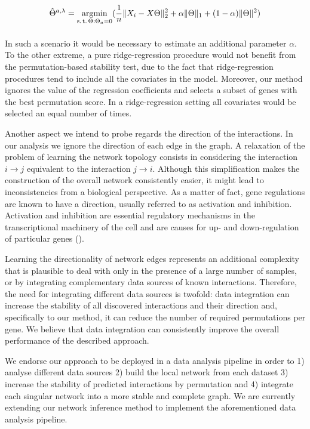 \begin{equation}
\label{eq:elnet}
    \hat{\Theta}^{a,\lambda} = 
    \argmin_{%
      \substack{%
        \text{s.\,t.}\, \Theta:\Theta_a = 0 \\
        \phantom{}\, 
      }
    }
    (\frac{1}{n} \| X_i - X\Theta \|^{2}_2 + \alpha \| \Theta \|_{1} + (1-\alpha) \| \Theta \|^{2})
  \end{equation}
   

In such a scenario it would be necessary to estimate an additional parameter $\alpha$. To the other extreme, a pure ridge-regression procedure would not benefit from the permutation-based stability test, due to the fact that ridge-regression procedures tend to include all the covariates in the model. Moreover, our method ignores the value of the regression coefficients and selects a subset of genes with the best permutation score. In a ridge-regression setting all covariates would be selected an equal number of times.  

Another aspect we intend to probe regards the direction of the interactions. In our analysis we ignore the direction of each edge in the graph. A relaxation of the problem of learning the network topology consists in considering the interaction $i \rightarrow j$ equivalent to the interaction $j \rightarrow i$. Although this simplification makes the construction of the overall network consistently easier, it might lead to inconsistencies from a biological perspective. As a matter of fact, gene regulations are known to have a direction, usually referred to as activation and inhibition. Activation and inhibition are essential regulatory mechanisms in the transcriptional machinery of the cell and are causes for up- and down-regulation of particular genes (\citealp{GeistlingerCKMZ11}).

 Learning the directionality of network edges represents an additional complexity that is plausible to deal with only in the presence of a large number of samples, or by integrating complementary data sources of known interactions. 
Therefore, the need for integrating different data sources is twofold: data integration can increase the stability of all discovered interactions and their direction and, specifically to our method, it can reduce the number of required permutations per gene. We believe that data integration can consistently  improve the overall performance of the described approach. 

We endorse our approach to be deployed in a data analysis pipeline in order to 1) analyse different data sources 2) build the local network from each dataset 3) increase the stability of predicted interactions by permutation and 4) integrate each singular network into a more stable and complete graph. 
We are currently extending our network inference method to implement the aforementioned data analysis pipeline. 

